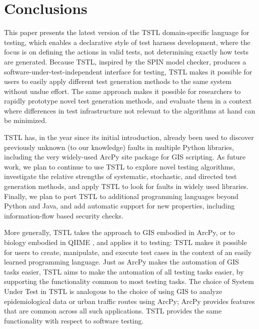 \section{Conclusions}
\label{sec:conclusion}

This paper presents the latest version of the TSTL
\cite{NFM15,ISSTA15,tstl} domain-specific language for testing, which
enables a declarative style of test harness development, where the
focus is on defining the actions in valid tests, not determining
exactly how tests are generated.  Because TSTL, inspired by the SPIN
model checker, produces a software-under-test-independent interface
for testing, TSTL makes it possible for users to easily apply
different test generation methods to the same system without undue
effort.  The same approach makes it possible for researchers to rapidly prototype novel test generation
methods, and evaluate them in a context where differences in test
infrastructure not relevant to the algorithms at hand can be minimized.

TSTL has, in the year since its initial introduction,
already been used to discover previously unknown (to our knowledge)
faults in multiple Python libraries, including the very widely-used
ArcPy site package for GIS scripting. 
As future work, we plan to continue to use TSTL to explore novel
testing algorithms, investigate the relative strengths of systematic,
stochastic, and directed test generation methods, and apply TSTL to
look for faults in widely used libraries.  Finally, we plan to
port TSTL to additional
programming languages beyond Python and Java, and add automatic
support for new properties, including
information-flow based security checks.

More generally, TSTL takes the approach to GIS embodied in ArcPy, or
to biology embodied in QIIME \cite{QIIME}, and applies it to testing:  TSTL
makes it possible for users to create, manipulate, and execute test
cases in the context of an easily learned programming language.  Just
as ArcPy makes the automation of GIS tasks easier, TSTL aims to make
the automation of all testing tasks easier, by supporting the
functionality common to most testing tasks.  The choice of System
Under Test in TSTL is analogous to the choice of using GIS to analyze
epidemiological data or urban traffic routes using ArcPy; ArcPy
provides features that are common across all such applications.  TSTL
provides the same functionality with respect to software testing.